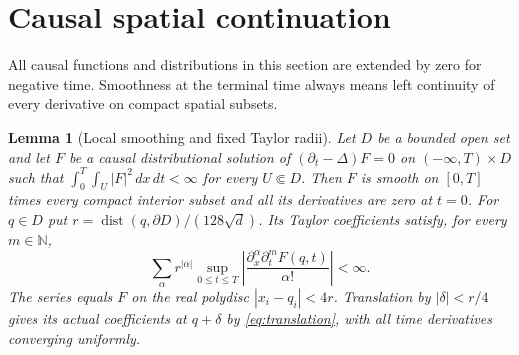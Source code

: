 \documentclass[11pt]{article}
\newtheorem{lemma}[theorem]{Lemma}
\theoremstyle{remark}
\newcommand{\N}{\mathbb N}
\newcommand{\dt}{\partial_t}
\DeclareMathOperator{\dist}{dist}
\begin{document}
\section{Causal spatial continuation}\label{sec:continuation}

All causal functions and distributions in this section are extended by zero
for negative time. Smoothness at the terminal time always means left
continuity of every derivative on compact spatial subsets.

\begin{lemma}[Local smoothing and fixed Taylor radii]\label{lem:Taylor}
Let $D$ be a bounded open set and let $F$ be a causal distributional
solution of $(\dt-\Delta)F=0$ on $(-\infty,T)\times D$ such that
$\int_0^T\int_U|F|^2\,dx\,dt<\infty$ for every $U\Subset D$.
Then $F$ is smooth on $[0,T]$ times every compact interior subset and
all its derivatives are zero at $t=0$.
For $q\in D$ put $r=\dist(q,\partial D)/(128\sqrt d)$.
Its Taylor coefficients satisfy, for every $m\in\N$,
\begin{equation}\label{eq:localbudget}
 \sum_\alpha r^{|\alpha|}
 \sup_{0\leq t\leq T}
       \left|\frac{\partial_x^\alpha\partial_t^mF(q,t)}{\alpha!}\right|
       <\infty .
\end{equation}
The series equals $F$ on the real polydisc $|x_i-q_i|<4r$.
Translation by $|\delta|<r/4$ gives its actual coefficients at $q+\delta$
by \eqref{eq:translation}, with all time derivatives converging uniformly.
\end{lemma}
\end{document}

